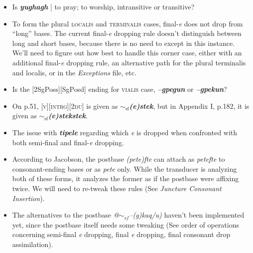 \documentclass{article}
\begin{document}
\begin{itemize}
\renewcommand\labelitemi{$\cdot$}

\item Is \textit{\textbf{yughagh}} | to pray; to worship, intransitive or transitive?

\item To form the plural \textsc{localis} and \textsc{terminalis} cases, final-\textit{e} does not drop from ``long'' bases.
%
The current final-\textit{e} dropping rule doesn't distinguish between long and short bases, because there is no need to except in this instance.
%
We'll need to figure out how best to handle this corner case, either with an additional final-\textit{e} dropping rule, an alternative path for the plural terminalis and localis, or in the \textit{Exceptions} file, etc.

\item Is the [2SgPoss][SgPosd] ending for \textsc{vialis} case, \textit{\textbf{--gpegun}} or \textit{\textbf{--gpekun}}?

\item On p.51, \textsc{[v][intrg][2du]} is given as \textit{\textbf{$\sim_\text{sf}$(e)stek}}, but in Appendix I, p.182, it is given as \textit{\textbf{$\sim_\text{sf}$(e)stekstek}}.

\item The issue with \textit{\textbf{tipele}} regarding which \textit{e} is dropped when confronted with both semi-final and final-\textit{e} dropping.

\item According to Jacobson, the postbase \textit{(pete)fte} can attach as \textit{petefte} to consonant-ending bases or as \textit{pete} only.
%
While the transducer is analyzing both of these forms, it analyzes the former as if the postbase were affixing twice.
%
We will need to re-tweak these rules (See \textit{Juncture Consonant Insertion}).

\item The alternatives to the postbase \textit{@$\sim_{sf}$--(g)kaq/u)} haven't been implemented yet, since the postbase itself needs some tweaking (See order of operations concerning semi-final \textit{e} dropping, final \textit{e} dropping, final consonant drop assimilation).

\end{itemize}
\end{document}
